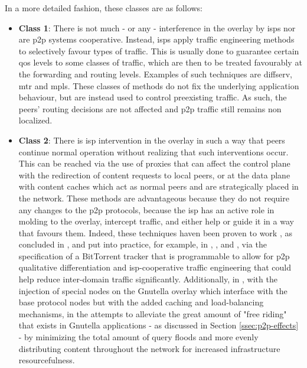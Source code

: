     In a more detailed fashion, these classes are as follows:

    \begin{itemize}
        \item \textbf{Class 1}:
            There is not much - or any - interference in the overlay by \glspl{isp} nor are \gls{p2p} systems cooperative.
            Instead, \glspl{isp} apply traffic engineering methods to selectively favour types of traffic.
            This is usually done to guarantee certain \gls{qos} levels to some classes of traffic, which are then to be treated favourably at the forwarding and routing levels.
            Examples of such techniques are \gls{diffserv}, \gls{mtr} and \gls{mpls}.
            These classes of methods do not fix the underlying application behaviour, but are instead used to control preexisting traffic.
            As such, the peers' routing decisions are not affected and \gls{p2p} traffic still remains non localized.
        \item \textbf{Class 2}:
            There is \gls{isp} intervention in the overlay in such a way that peers continue normal operation without realizing that such interventions occur.
            This can be reached via the use of proxies that can affect the control plane with the redirection of content requests to local peers, or at the data plane with content caches which act as normal peers and are strategically placed in the network.
            These methods are advantageous because they do not require any changes to the \gls{p2p} protocols, because the \gls{isp} has an active role in molding to the overlay, intercept traffic, and either help or guide it in a way that favours them.
            Indeed, these techniques haven been proven to work , as concluded in \cite{dan-Commag10}, and put into practice, for example, in \cite{programmable-trackers}, \cite{configurable-trackers}, and \cite{rev3}, via the specification of a BitTorrent tracker that is programmable to allow for \gls{p2p} qualitative differentiation and \gls{isp}-cooperative traffic engineering that could help reduce inter-domain traffic significantly.
            Additionally, in \cite{altruistic-gnutella}, with the injection of special nodes on the Gnutella overlay which interface with the base protocol nodes but with the added caching and load-balancing mechanisms, in the attempts to alleviate the great amount of "free riding" that exists in Gnutella applications - as discussed in Section \ref{ssec:p2p-effects} - by minimizing the total amount of query floods and more evenly distributing content throughout the network for increased infrastructure resourcefulness.

\end{itemize}
